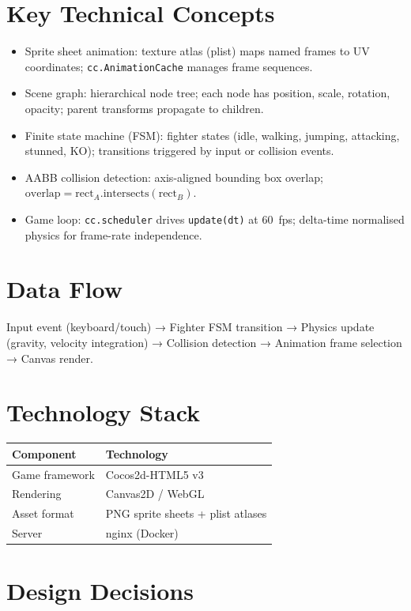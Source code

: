 \documentclass[11pt,a4paper]{article}
\begin{document}
\section{Key Technical Concepts}
\begin{itemize}[leftmargin=1.5em]
  \item Sprite sheet animation: texture atlas (plist) maps named frames to UV coordinates; \texttt{cc.AnimationCache} manages frame sequences.
  \item Scene graph: hierarchical node tree; each node has position, scale, rotation, opacity; parent transforms propagate to children.
  \item Finite state machine (FSM): fighter states (idle, walking, jumping, attacking, stunned, KO); transitions triggered by input or collision events.
  \item AABB collision detection: axis-aligned bounding box overlap; $\text{overlap} = \text{rect}_A.\text{intersects}(\text{rect}_B)$.
  \item Game loop: \texttt{cc.scheduler} drives \texttt{update(dt)} at 60~fps; delta-time normalised physics for frame-rate independence.
\end{itemize}

\section{Data Flow}

Input event (keyboard/touch) →
Fighter FSM transition →
Physics update (gravity, velocity integration) →
Collision detection →
Animation frame selection →
Canvas render.


\section{Technology Stack}

\begin{tabular}{ll}
\toprule
\textbf{Component} & \textbf{Technology} \\
\midrule
Game framework & Cocos2d-HTML5 v3 \\
Rendering & Canvas2D / WebGL \\
Asset format & PNG sprite sheets + plist atlases \\
Server & nginx (Docker) \\
\bottomrule
\end{tabular}


\section{Design Decisions}
\end{document}
